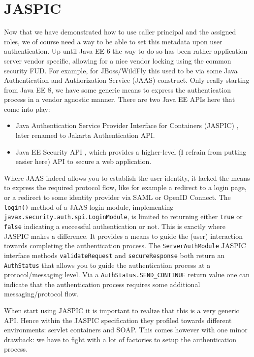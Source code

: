 \section{JASPIC}
Now that we have demonstrated how to use caller principal and the assigned roles,
we of course need a way to be able to set this metadata upon user authentication.
Up until Java EE 6 the way to do so has been rather application server vendor specific,
allowing for a nice vendor locking using the common security FUD.
For example, for JBoss/WildFly this used to be via some Java Authentication and Authorization Service (JAAS) \cite{jaas} construct.
Only really starting from Java EE 8, we have some generic means to express the authentication process in a vendor agnostic manner.
There are two Java EE APIs here that come into play:
\begin{itemize}
	\item Java Authentication Service Provider Interface for Containers (JASPIC) \cite{jaspic}, later renamed to Jakarta Authentication API.
	\item Java EE Security API \cite{security-api}, which provides a higher-level (I refrain from putting easier here) API to secure a web application.
\end{itemize}
Where JAAS indeed allows you to establish the user identity,
 it lacked the means to express the required protocol flow, like for example a redirect to a login page,
or a redirect to some identity provider via SAML or OpenID Connect.
The \texttt{login()} method of a JAAS login module, implementing \texttt{javax.security.auth.spi.LoginModule}, is limited to returning either \texttt{true} or \texttt{false} indicating a successful authentication or not.
This is exactly where JASPIC makes a difference.
It provides a means to guide the (user) interaction towards completing the authentication process.
The \texttt{ServerAuthModule} JASPIC interface methods \texttt{validateRequest} and \texttt{secureResponse} both return an \texttt{AuthStatus} that allows you to guide the authentication process at a protocol/messaging level.
Via a \texttt{AuthStatus.SEND\_CONTINUE} return value one can indicate that the authentication process requires some additional messaging/protocol flow.

When start using JASPIC it is important to realize that this is a very generic API.
Hence within the JASPIC specification \cite{jaspic} they profiled towards different environments: servlet containers and SOAP.
This comes however with one minor drawback: we have to fight with a lot of factories to setup the authentication process.

